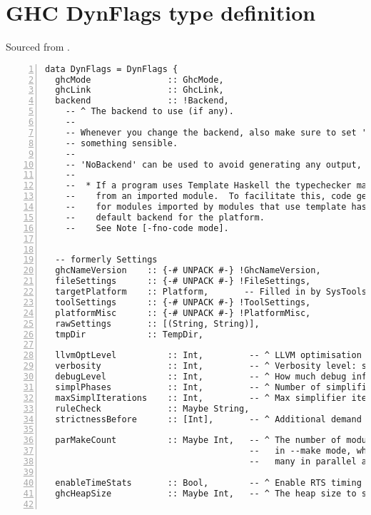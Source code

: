 \documentclass[en]{pracamgr}
\begin{document}
\appendix

\chapter{GHC DynFlags type definition}\label{appendix:typedef}
Sourced from \cite{GHCDynFlagsDefinition}.
\begin{lstlisting}[numbers=left,stepnumber=1]
data DynFlags = DynFlags {
  ghcMode               :: GhcMode,
  ghcLink               :: GhcLink,
  backend               :: !Backend,
    -- ^ The backend to use (if any).
    --
    -- Whenever you change the backend, also make sure to set 'ghcLink' to
    -- something sensible.
    --
    -- 'NoBackend' can be used to avoid generating any output, however, note that:
    --
    --  * If a program uses Template Haskell the typechecker may need to run code
    --    from an imported module.  To facilitate this, code generation is enabled
    --    for modules imported by modules that use template haskell, using the
    --    default backend for the platform.
    --    See Note [-fno-code mode].


  -- formerly Settings
  ghcNameVersion    :: {-# UNPACK #-} !GhcNameVersion,
  fileSettings      :: {-# UNPACK #-} !FileSettings,
  targetPlatform    :: Platform,       -- Filled in by SysTools
  toolSettings      :: {-# UNPACK #-} !ToolSettings,
  platformMisc      :: {-# UNPACK #-} !PlatformMisc,
  rawSettings       :: [(String, String)],
  tmpDir            :: TempDir,

  llvmOptLevel          :: Int,         -- ^ LLVM optimisation level
  verbosity             :: Int,         -- ^ Verbosity level: see Note [Verbosity levels]
  debugLevel            :: Int,         -- ^ How much debug information to produce
  simplPhases           :: Int,         -- ^ Number of simplifier phases
  maxSimplIterations    :: Int,         -- ^ Max simplifier iterations
  ruleCheck             :: Maybe String,
  strictnessBefore      :: [Int],       -- ^ Additional demand analysis

  parMakeCount          :: Maybe Int,   -- ^ The number of modules to compile in parallel
                                        --   in --make mode, where Nothing ==> compile as
                                        --   many in parallel as there are CPUs.

  enableTimeStats       :: Bool,        -- ^ Enable RTS timing statistics?
  ghcHeapSize           :: Maybe Int,   -- ^ The heap size to set.


\end{lstlisting}
\end{document}
